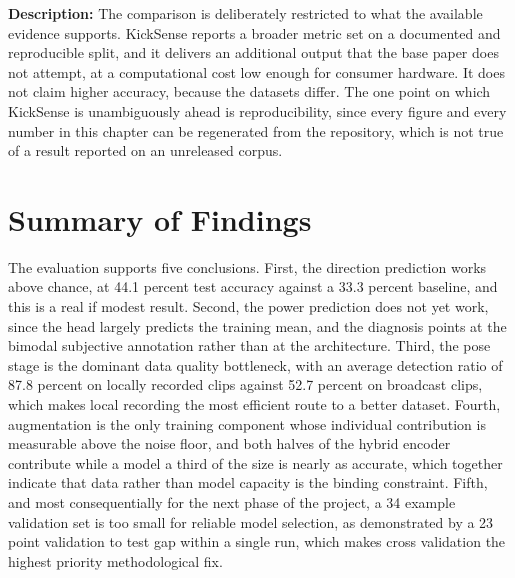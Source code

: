 \noindent
\textbf{Description:} The comparison is deliberately restricted to what the available evidence supports. KickSense reports a broader metric set on a documented and reproducible split, and it delivers an additional output that the base paper does not attempt, at a computational cost low enough for consumer hardware. It does not claim higher accuracy, because the datasets differ. The one point on which KickSense is unambiguously ahead is reproducibility, since every figure and every number in this chapter can be regenerated from the repository, which is not true of a result reported on an unreleased corpus.

\section{Summary of Findings}

The evaluation supports five conclusions. First, the direction prediction works above chance, at 44.1 percent test accuracy against a 33.3 percent baseline, and this is a real if modest result. Second, the power prediction does not yet work, since the head largely predicts the training mean, and the diagnosis points at the bimodal subjective annotation rather than at the architecture. Third, the pose stage is the dominant data quality bottleneck, with an average detection ratio of 87.8 percent on locally recorded clips against 52.7 percent on broadcast clips, which makes local recording the most efficient route to a better dataset. Fourth, augmentation is the only training component whose individual contribution is measurable above the noise floor, and both halves of the hybrid encoder contribute while a model a third of the size is nearly as accurate, which together indicate that data rather than model capacity is the binding constraint. Fifth, and most consequentially for the next phase of the project, a 34 example validation set is too small for reliable model selection, as demonstrated by a 23 point validation to test gap within a single run, which makes cross validation the highest priority methodological fix.

\clearpage
